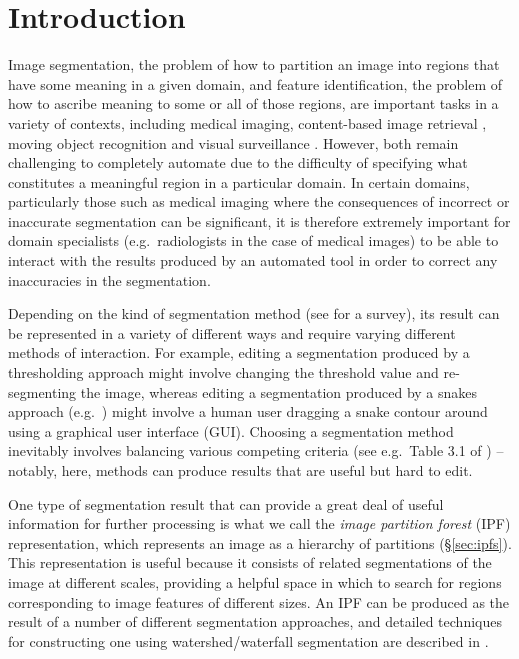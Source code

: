 \documentclass[10pt,twocolumn,twoside]{IEEEtran}
\begin{document}
\section{Introduction}


Image segmentation, the problem of how to partition an image into regions that have some meaning in a given domain, and feature identification, the problem of how to ascribe meaning to some or all of those regions, are important tasks in a variety of contexts, including medical imaging, content-based image retrieval \cite{liu06}, moving object recognition \cite{zhang01} and visual surveillance \cite{hu04}. However, both remain challenging to completely automate due to the difficulty of specifying what constitutes a meaningful region in a particular domain. In certain domains, particularly those such as medical imaging where the consequences of incorrect or inaccurate segmentation can be significant, it is therefore extremely important for domain specialists (e.g.~radiologists in the case of medical images) to be able to interact with the results produced by an automated tool in order to correct any inaccuracies in the segmentation.

Depending on the kind of segmentation method (see \cite{golodetz11} for a survey), its result can be represented in a variety of different ways and require varying different methods of interaction. For example, editing a segmentation produced by a thresholding approach might involve changing the threshold value and re-segmenting the image, whereas editing a segmentation produced by a snakes approach (e.g.~\cite{kass88,lobregt95}) might involve a human user dragging a snake contour around using a graphical user interface (GUI). Choosing a segmentation method inevitably involves balancing various competing criteria (see e.g.~Table 3.1 of \cite{golodetz11}) -- notably, here, methods can produce results that are useful but hard to edit.

One type of segmentation result that can provide a great deal of useful information for further processing is what we call the \emph{image partition forest} (IPF) representation, which represents an image as a hierarchy of partitions (\S\ref{sec:ipfs}). This representation is useful because it consists of related segmentations of the image at different scales, providing a helpful space in which to search for regions corresponding to image features of different sizes. An IPF can be produced as the result of a number of different segmentation approaches, and detailed techniques for constructing one using watershed/waterfall segmentation are described in \cite{golodetz11}.
\end{document}
